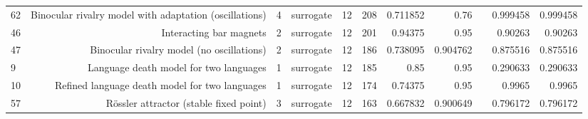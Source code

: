 \begin{table}[htbp]
\begin{tabular}{lrrrrrrrrrr}
62 & Binocular rivalry model with adaptation (oscillations) & 4 & surrogate & 12 & 208 & 0.711852 & 0.76 &  & 0.999458 & 0.999458 \\
46 & Interacting bar magnets & 2 & surrogate & 12 & 201 & 0.94375 & 0.95 &  & 0.90263 & 0.90263 \\
47 & Binocular rivalry model (no oscillations) & 2 & surrogate & 12 & 186 & 0.738095 & 0.904762 &  & 0.875516 & 0.875516 \\
9 & Language death model for two languages & 1 & surrogate & 12 & 185 & 0.85 & 0.95 &  & 0.290633 & 0.290633 \\
10 & Refined language death model for two languages & 1 & surrogate & 12 & 174 & 0.74375 & 0.95 &  & 0.9965 & 0.9965 \\
57 & Rössler attractor (stable fixed point) & 3 & surrogate & 12 & 163 & 0.667832 & 0.900649 &  & 0.796172 & 0.796172 \\
\bottomrule
\end{tabular}
\end{table}
